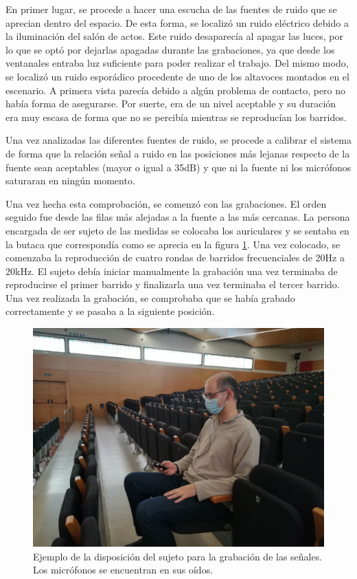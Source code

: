 \documentclass[11pt,a4paper]{book}
\begin{document}
            En primer lugar, se procede a hacer una escucha de las fuentes de ruido que se aprecian dentro del espacio. De esta forma, se localizó un ruido eléctrico debido a la iluminación del salón de actos. Este ruido desaparecía al apagar las luces, por lo que se optó por dejarlas apagadas durante las grabaciones, ya que desde los ventanales entraba luz suficiente para poder realizar el trabajo. Del mismo modo, se localizó un ruido esporádico procedente de uno de los altavoces montados en el escenario. A primera vista parecía debido a algún problema de contacto, pero no había forma de asegurarse. Por suerte, era de un nivel aceptable y su duración era muy escasa de forma que no se percibía mientras se reproducían los barridos.
                
            Una vez analizadas las diferentes fuentes de ruido, se procede a calibrar el sistema de forma que la relación señal a ruido en las posiciones más lejanas respecto de la fuente sean aceptables (mayor o igual a 35dB) y que ni la fuente ni los micrófonos saturaran en ningún momento.
                
            Una vez hecha esta comprobación, se comenzó con las grabaciones. El orden seguido fue desde las filas más alejadas a la fuente a las más cercanas. La persona encargada de ser sujeto de las medidas se colocaba los auriculares y se sentaba en la butaca que correspondía como se aprecia en la figura \ref{fig:Nico}. Una vez colocado, se comenzaba la reproducción de cuatro rondas de barridos frecuenciales de 20Hz a 20kHz. El sujeto debía iniciar manualmente la grabación una vez terminaba de reproducirse el primer barrido y finalizarla una vez terminaba el tercer barrido. Una vez realizada la grabación, se comprobaba que se había grabado correctamente y se pasaba a la siguiente posición. 
                
            \begin{figure}[H]
                \includegraphics[scale=0.3]{../imagenes/Nico.jpg}
                \centering
                \caption{Ejemplo de la disposición del sujeto para la grabación de las señales. Los micrófonos se encuentran en sus oídos.}
                \label{fig:Nico}
            \end{figure}
                
\end{document}
